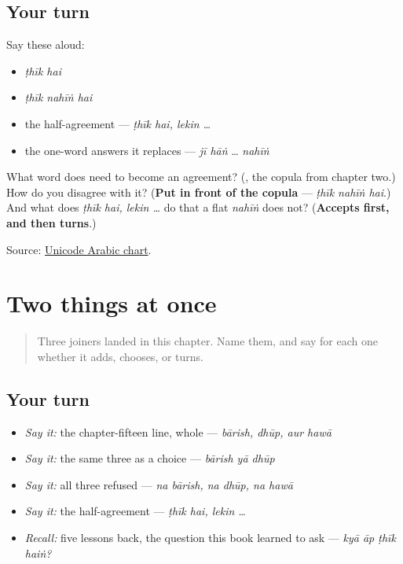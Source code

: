 \subsection*{Your turn}
Say these aloud:

\begin{itemize}
\raggedright
  \item \emph{ṭhīk hai}
  \item \emph{ṭhīk nahīṅ hai}
  \item the half-agreement — \emph{ṭhīk hai, lekin …}
  \item the one-word answers it replaces — \emph{jī hāṅ} … \emph{nahīṅ}
\end{itemize}

\begin{tcolorbox}[breakable,colback=teal!4,colframe=teal!35!black,title={Before you move on}]
What word does \textbf{} need to become an agreement? (\textbf{}, the copula from chapter two.) How do you disagree with it? (\textbf{Put  in front of the copula} — \emph{ṭhīk nahīṅ hai}.) And what does \emph{ṭhīk hai, lekin …} do that a flat \emph{nahīṅ} does not? (\textbf{Accepts first, and then turns}.)

Source: \href{https://www.unicode.org/charts/PDF/U0600.pdf}{Unicode Arabic chart}.
\end{tcolorbox}
\section[\texorpdfstring{\ur{اور} · \ur{یا} · \ur{لیکن} (aur · yā · lekin)}{اور · یا · لیکن (aur · yā · lekin)}]{Two things at once}

\label{lesson:UR-R20-joined-and-turned}



\begin{quote}
Three joiners landed in this chapter. Name them, and say for each one whether it adds, chooses, or turns.
\end{quote}

\subsection*{Your turn}
\begin{itemize}
\raggedright
  \item \emph{Say it:} the chapter-fifteen line, whole — \emph{bārish, dhūp, aur hawā}
  \item \emph{Say it:} the same three as a choice — \emph{bārish yā dhūp}
  \item \emph{Say it:} all three refused — \emph{na bārish, na dhūp, na hawā}
  \item \emph{Say it:} the half-agreement — \emph{ṭhīk hai, lekin …}
  \item \emph{Recall:} five lessons back, the question this book learned to ask — \emph{kyā āp ṭhīk haiṅ?}
\end{itemize}

